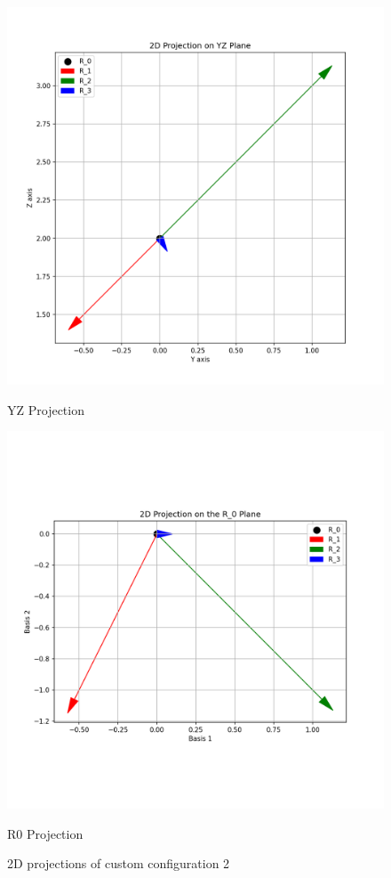 \begin{figure}[H]
    \begin{minipage}{0.48\textwidth}
        \centering
        \includegraphics[width=\textwidth]{figures/custom2_yz.png}
        \caption*{YZ Projection}
    \end{minipage}\hfill
    \begin{minipage}{0.48\textwidth}
        \centering
        \includegraphics[width=\textwidth]{figures/custom2_r0.png}
        \caption*{R0 Projection}
    \end{minipage}
    \caption{2D projections of custom configuration 2}
    \label{fig:example_custom2_2d}
\end{figure}


